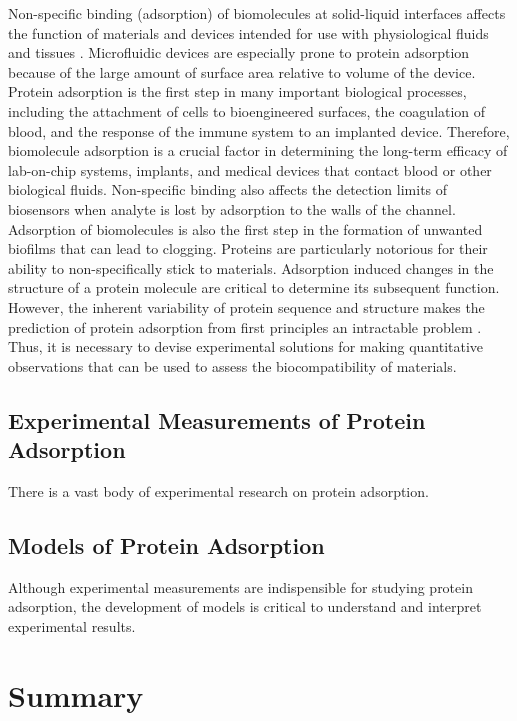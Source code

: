 Non-specific binding (adsorption) of biomolecules at solid-liquid
interfaces affects the function of materials and devices intended
for use with physiological fluids and tissues \cite{Andrade1986}.
Microfluidic devices are especially prone to protein adsorption because
of the large amount of surface area relative to volume of the device.
Protein adsorption is the first step in many important biological
processes, including the attachment of cells to bioengineered surfaces,
the coagulation of blood, and the response of the immune system to
an implanted device. Therefore, biomolecule adsorption is a crucial
factor in determining the long-term efficacy of lab-on-chip systems,
implants, and medical devices that contact blood or other biological
fluids. Non-specific binding also affects the detection limits of
biosensors when analyte is lost by adsorption to the walls of the
channel. Adsorption of biomolecules is also the first step in the
formation of unwanted biofilms that can lead to clogging. Proteins
are particularly notorious for their ability to non-specifically stick
to materials. Adsorption induced changes in the structure of a protein
molecule are critical to determine its subsequent function. However,
the inherent variability of protein sequence and structure makes the
prediction of protein adsorption from first principles an intractable
problem \cite{Wilson2004}. Thus, it is necessary to devise experimental
solutions for making quantitative observations that can be used to
assess the biocompatibility of materials.


\subsection{Experimental Measurements of Protein Adsorption}

There is a vast body of experimental research on protein adsorption. 


\subsection{Models of Protein Adsorption}

Although experimental measurements are indispensible for studying
protein adsorption, the development of models is critical to understand
and interpret experimental results.




\section{Summary}

